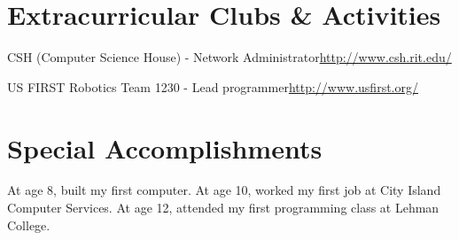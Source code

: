 \documentclass[a4paper,margin,line]{resume}
\newcommand{\rurl}[1]{\hfill {\footnotesize \url{#1}}}
\begin{document}
\begin{resume}
\section{\mysidestyle Extracurricular Clubs \& Activities}
	\begin{asparablank}
		\item CSH ({\small Computer Science House}) - Network Administrator\rurl{http://www.csh.rit.edu/}
		\item US FIRST Robotics Team 1230 - {\small Lead programmer}\rurl{http://www.usfirst.org/}
	\end{asparablank}


\section{\mysidestyle Special Accomplishments}
	\begin{asparablank}
		\item At age 8, built my first computer. At age 10, worked my first job at City Island Computer Services. At age 12, attended my first programming class at Lehman College.
	\end{asparablank}

\end{resume}
\end{document}

